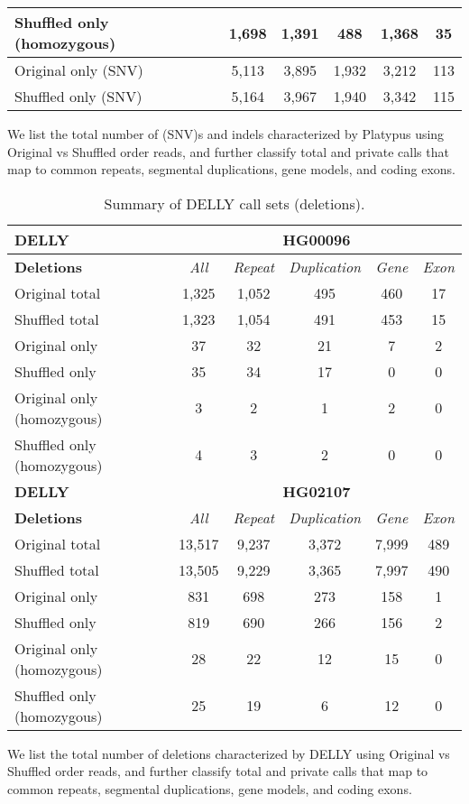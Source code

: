 \begin{table}[htb]
\begin{center}
\begin{tabular}{|l|c||c|c|c|c|}
\hline
Shuffled only (homozygous) & 1,698 & 1,391 & 488 & 1,368 & 35 \\
\hline
Original only (SNV) & 5,113 & 3,895 & 1,932 & 3,212 & 113 \\
\hline
Shuffled only (SNV) & 5,164 & 3,967 & 1,940 & 3,342 & 115 \\ 
\hline
\end{tabular}
\end{center}
{\footnotesize We list the total number of (SNV)s and indels characterized by Platypus using Original vs Shuffled order reads, 
and further classify total and private calls that map to common repeats, segmental duplications, gene models, and coding exons.}
\label{supptab:orig-vs-shuf-platypus}
\end{table}

\begin{table}[htb]
\caption{ Summary of DELLY call sets (deletions). }
\begin{center}
\begin{tabular}{|l|c||c|c|c|c|}
\hline
{\bf DELLY} & \multicolumn{5}{|c|}{\bf HG00096} \\
\hline
\cline{2-6}
{\bf Deletions} & {\it All} & {\it Repeat} & {\it Duplication} & {\it Gene} & {\it Exon} \\
\hline
Original total & 1,325 & 1,052 & 495 & 460 & 17\\ 
\hline
Shuffled total & 1,323 & 1,054 & 491 & 453 & 15\\ 
\hline
Original only & 37 & 32 & 21 & 7 & 2\\ 
\hline
Shuffled only & 35 & 34 & 17 & 0 & 0\\ 
\hline
Original only (homozygous) & 3 & 2 & 1 & 2 & 0\\ 
\hline
Shuffled only (homozygous) & 4 & 3 & 2 & 0 & 0\\ 
\hline
\hline
{\bf DELLY} & \multicolumn{5}{|c|}{\bf HG02107} \\
\hline
\cline{2-6}
{\bf Deletions} & {\it All} & {\it Repeat} & {\it Duplication} & {\it Gene} & {\it Exon} \\
\hline
Original total & 13,517 & 9,237 & 3,372 & 7,999 & 489\\ 
\hline
Shuffled total & 13,505 & 9,229 & 3,365 & 7,997 & 490\\ 
\hline
Original only & 831 & 698 & 273 & 158 & 1\\ 
\hline
Shuffled only & 819 & 690 & 266 & 156 & 2\\ 
\hline
Original only (homozygous) & 28 & 22 & 12 & 15 & 0\\ 
\hline
Shuffled only (homozygous) & 25 & 19 & 6 & 12 & 0\\ 
\hline
\end{tabular}
\end{center}
{\footnotesize We list the total number of deletions characterized by DELLY using Original vs Shuffled order reads, 
and further classify total and private calls that map to common repeats, segmental duplications, gene models, and coding exons.}
\label{supptab:orig-vs-shuf-delly-deletions}
\end{table}

